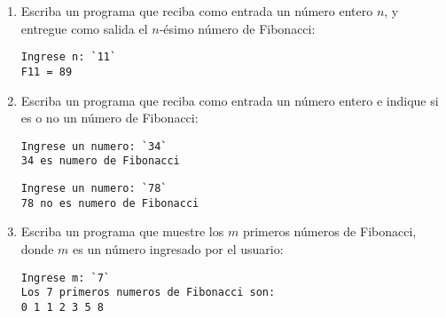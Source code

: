 \begin{enumerate}

  \item
    Escriba un programa que reciba como entrada un número entero \(n\),
    y entregue como salida el \(n\)-ésimo número de Fibonacci:

\begin{lstlisting}[language=testcase]
Ingrese n: `11`
F11 = 89
\end{lstlisting}

  \item
    Escriba un programa que reciba como entrada un número entero e indique
    si es o no un número de Fibonacci:

\begin{lstlisting}[language=testcase]
Ingrese un numero: `34`
34 es numero de Fibonacci
\end{lstlisting}

\begin{lstlisting}[language=testcase]
Ingrese un numero: `78`
78 no es numero de Fibonacci
\end{lstlisting}

  \item
    Escriba un programa que muestre los \(m\) primeros números de
    Fibonacci, donde \(m\) es un número ingresado por el usuario:

\begin{lstlisting}[language=testcase]
Ingrese m: `7`
Los 7 primeros numeros de Fibonacci son:
0 1 1 2 3 5 8
\end{lstlisting}

\end{enumerate}
